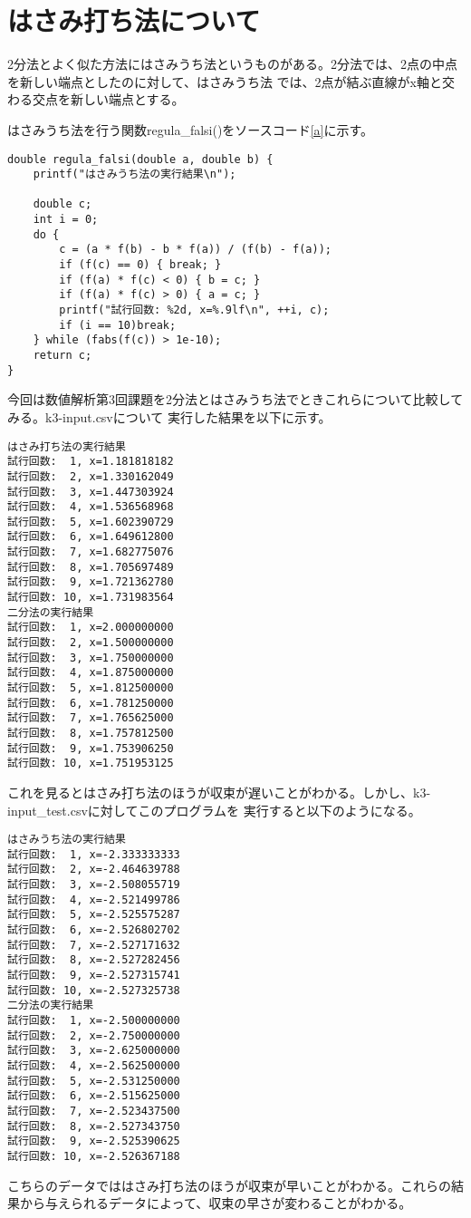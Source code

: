 \documentclass[titlepage]{jsarticle}
\begin{document}
	\section{はさみ打ち法について}
		2分法とよく似た方法にはさみうち法というものがある。2分法では、2点の中点を新しい端点としたのに対して、はさみうち法
		では、2点が結ぶ直線がx軸と交わる交点を新しい端点とする。\cite{hasami}

		はさみうち法を行う関数regula\_falsi()をソースコード\ref{a}に示す。
		\begin{lstlisting}[caption=作成した関数regula\_falsi(), label=a]
double regula_falsi(double a, double b) {
	printf("はさみうち法の実行結果\n");

	double c;
	int i = 0;
	do {
		c = (a * f(b) - b * f(a)) / (f(b) - f(a));
		if (f(c) == 0) { break; }
		if (f(a) * f(c) < 0) { b = c; }
		if (f(a) * f(c) > 0) { a = c; }
		printf("試行回数: %2d, x=%.9lf\n", ++i, c);
		if (i == 10)break;
	} while (fabs(f(c)) > 1e-10);
	return c;
}		\end{lstlisting}

		今回は数値解析第3回課題を2分法とはさみうち法でときこれらについて比較してみる。k3-input.csvについて
		実行した結果を以下に示す。
\begin{verbatim}
はさみ打ち法の実行結果
試行回数:  1, x=1.181818182
試行回数:  2, x=1.330162049
試行回数:  3, x=1.447303924
試行回数:  4, x=1.536568968
試行回数:  5, x=1.602390729
試行回数:  6, x=1.649612800
試行回数:  7, x=1.682775076
試行回数:  8, x=1.705697489
試行回数:  9, x=1.721362780
試行回数: 10, x=1.731983564
二分法の実行結果
試行回数:  1, x=2.000000000
試行回数:  2, x=1.500000000
試行回数:  3, x=1.750000000
試行回数:  4, x=1.875000000
試行回数:  5, x=1.812500000
試行回数:  6, x=1.781250000
試行回数:  7, x=1.765625000
試行回数:  8, x=1.757812500
試行回数:  9, x=1.753906250
試行回数: 10, x=1.751953125
\end{verbatim}
	これを見るとはさみ打ち法のほうが収束が遅いことがわかる。しかし、k3-input\_test.csvに対してこのプログラムを
	実行すると以下のようになる。
\begin{verbatim}
はさみうち法の実行結果
試行回数:  1, x=-2.333333333
試行回数:  2, x=-2.464639788
試行回数:  3, x=-2.508055719
試行回数:  4, x=-2.521499786
試行回数:  5, x=-2.525575287
試行回数:  6, x=-2.526802702
試行回数:  7, x=-2.527171632
試行回数:  8, x=-2.527282456
試行回数:  9, x=-2.527315741
試行回数: 10, x=-2.527325738
二分法の実行結果
試行回数:  1, x=-2.500000000
試行回数:  2, x=-2.750000000
試行回数:  3, x=-2.625000000
試行回数:  4, x=-2.562500000
試行回数:  5, x=-2.531250000
試行回数:  6, x=-2.515625000
試行回数:  7, x=-2.523437500
試行回数:  8, x=-2.527343750
試行回数:  9, x=-2.525390625
試行回数: 10, x=-2.526367188
\end{verbatim}
	こちらのデータでははさみ打ち法のほうが収束が早いことがわかる。これらの結果から与えられるデータによって、収束の早さが変わることがわかる。
\end{document}
